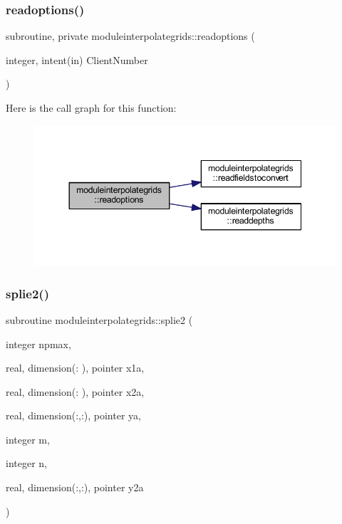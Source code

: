\subsubsection{\texorpdfstring{readoptions()}{readoptions()}}
{\footnotesize\ttfamily subroutine, private moduleinterpolategrids\+::readoptions (\begin{DoxyParamCaption}\item[{integer, intent(in)}]{Client\+Number }\end{DoxyParamCaption})\hspace{0.3cm}{\ttfamily [private]}}

Here is the call graph for this function\+:\nopagebreak
\begin{figure}[H]
\begin{center}
\leavevmode
\includegraphics[width=344pt]{namespacemoduleinterpolategrids_a18ff5c4dd12a7c5ee25d5ceaf91fd501_cgraph}
\end{center}
\end{figure}
\mbox{\label{namespacemoduleinterpolategrids_aaaaf0fdabdeb343cb80f4c083588e3ec}} 
\subsubsection{\texorpdfstring{splie2()}{splie2()}}
{\footnotesize\ttfamily subroutine moduleinterpolategrids\+::splie2 (\begin{DoxyParamCaption}\item[{integer}]{npmax,  }\item[{real, dimension(\+:  ), pointer}]{x1a,  }\item[{real, dimension(\+:  ), pointer}]{x2a,  }\item[{real, dimension(\+:,\+:), pointer}]{ya,  }\item[{integer}]{m,  }\item[{integer}]{n,  }\item[{real, dimension(\+:,\+:), pointer}]{y2a }\end{DoxyParamCaption})\hspace{0.3cm}{\ttfamily [private]}}

